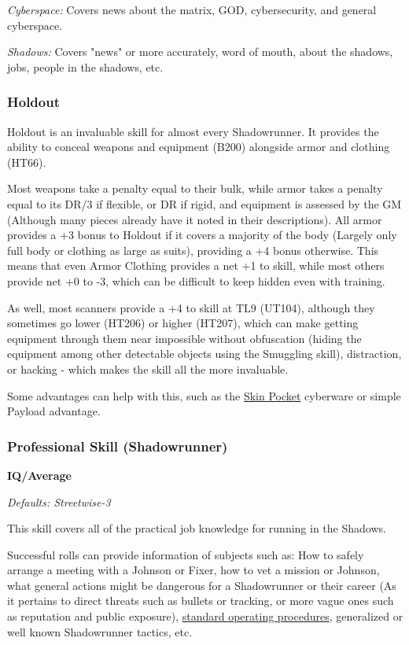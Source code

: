 \begin{multicols}{3}
	\textit{Cyberspace:} Covers news about the matrix, GOD, cybersecurity, and general cyberspace.
	
	\textit{Shadows:} Covers "news" or more accurately, word of mouth, about the shadows, jobs, people in the shadows, etc.
	
	\subsubsection*{Holdout}\label{holdout}
	Holdout is an invaluable skill for almost every Shadowrunner. It provides the ability to conceal weapons and equipment (B200) alongside armor and clothing (HT66). 
	
	Most weapons take a penalty equal to their bulk, while armor takes a penalty equal to its DR/3 if flexible, or DR if rigid, and equipment is assessed by the GM (Although many pieces already have it noted in their descriptions). All armor provides a +3 bonus to Holdout if it covers a majority of the body (Largely only full body or clothing as large as suits), providing a +4 bonus otherwise. This means that even Armor Clothing provides a net +1 to skill, while most others provide net +0 to -3, which can be difficult to keep hidden even with training.
	
	As well, most scanners provide a +4 to skill at TL9 (UT104), although they sometimes go lower (HT206) or higher (HT207), which can make getting equipment through them near impossible without obfuscation (hiding the equipment among other detectable objects using the Smuggling skill), distraction, or hacking - which makes the skill all the more invaluable.
	
	Some advantages can help with this, such as the \hyperref[skin_pocket]{Skin Pocket} cyberware or simple Payload advantage.	
	
	\subsubsection*{Professional Skill (Shadowrunner)}
	\begin{flushright}
		\textbf{IQ/Average}
	\end{flushright}
	\textit{\textcolor{NavyBlue}{Defaults: Streetwise-3}}
	
	This skill covers all of the practical job knowledge for running in the Shadows. 
	
	Successful rolls can provide information of subjects such as: How to safely arrange a meeting with a Johnson or Fixer, how to vet a mission or Johnson, what general actions might be dangerous for a Shadowrunner or their career (As it pertains to direct threats such as bullets or tracking, or more vague ones such as reputation and public exposure), \textcolor{Blue}{\href{https://docs.google.com/document/d/1ydfYWrtSEOtMoSOpVesdoS2iJw_fOHHDZA1RMCXlY8Y/edit?usp=drivesdk}{standard operating procedures}}, generalized or well known Shadowrunner tactics, etc.
	

\end{multicols}
